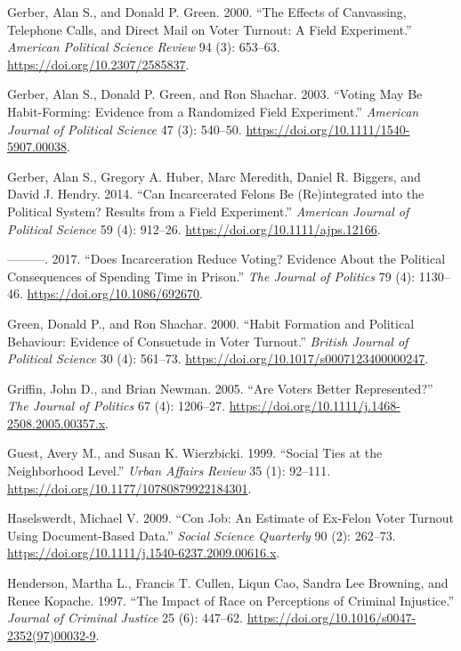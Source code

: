 \documentclass[]{article}
\begin{document}
\leavevmode\hypertarget{ref-Gerber2000}{}%
Gerber, Alan S., and Donald P. Green. 2000. ``The Effects of Canvassing, Telephone Calls, and Direct Mail on Voter Turnout: A Field Experiment.'' \emph{American Political Science Review} 94 (3): 653--63. \url{https://doi.org/10.2307/2585837}.

\leavevmode\hypertarget{ref-Gerber2003}{}%
Gerber, Alan S., Donald P. Green, and Ron Shachar. 2003. ``Voting May Be Habit-Forming: Evidence from a Randomized Field Experiment.'' \emph{American Journal of Political Science} 47 (3): 540--50. \url{https://doi.org/10.1111/1540-5907.00038}.

\leavevmode\hypertarget{ref-Gerber2014}{}%
Gerber, Alan S., Gregory A. Huber, Marc Meredith, Daniel R. Biggers, and David J. Hendry. 2014. ``Can Incarcerated Felons Be (Re)integrated into the Political System? Results from a Field Experiment.'' \emph{American Journal of Political Science} 59 (4): 912--26. \url{https://doi.org/10.1111/ajps.12166}.

\leavevmode\hypertarget{ref-Gerber2017}{}%
---------. 2017. ``Does Incarceration Reduce Voting? Evidence About the Political Consequences of Spending Time in Prison.'' \emph{The Journal of Politics} 79 (4): 1130--46. \url{https://doi.org/10.1086/692670}.

\leavevmode\hypertarget{ref-Green2000}{}%
Green, Donald P., and Ron Shachar. 2000. ``Habit Formation and Political Behaviour: Evidence of Consuetude in Voter Turnout.'' \emph{British Journal of Political Science} 30 (4): 561--73. \url{https://doi.org/10.1017/s0007123400000247}.

\leavevmode\hypertarget{ref-Griffin2005}{}%
Griffin, John D., and Brian Newman. 2005. ``Are Voters Better Represented?'' \emph{The Journal of Politics} 67 (4): 1206--27. \url{https://doi.org/10.1111/j.1468-2508.2005.00357.x}.

\leavevmode\hypertarget{ref-Guest1999}{}%
Guest, Avery M., and Susan K. Wierzbicki. 1999. ``Social Ties at the Neighborhood Level.'' \emph{Urban Affairs Review} 35 (1): 92--111. \url{https://doi.org/10.1177/10780879922184301}.

\leavevmode\hypertarget{ref-Haselswerdt2009}{}%
Haselswerdt, Michael V. 2009. ``Con Job: An Estimate of Ex-Felon Voter Turnout Using Document-Based Data.'' \emph{Social Science Quarterly} 90 (2): 262--73. \url{https://doi.org/10.1111/j.1540-6237.2009.00616.x}.

\leavevmode\hypertarget{ref-Henderson1997}{}%
Henderson, Martha L., Francis T. Cullen, Liqun Cao, Sandra Lee Browning, and Renee Kopache. 1997. ``The Impact of Race on Perceptions of Criminal Injustice.'' \emph{Journal of Criminal Justice} 25 (6): 447--62. \url{https://doi.org/10.1016/s0047-2352(97)00032-9}.
\end{document}
